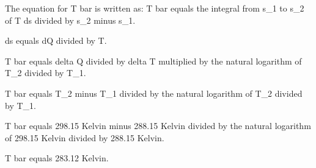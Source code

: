 The equation for T bar is written as:  
T bar equals the integral from s_1 to s_2 of T ds divided by s_2 minus s_1.  

ds equals dQ divided by T.  

T bar equals delta Q divided by delta T multiplied by the natural logarithm of T_2 divided by T_1.  

T bar equals T_2 minus T_1 divided by the natural logarithm of T_2 divided by T_1.  

T bar equals 298.15 Kelvin minus 288.15 Kelvin divided by the natural logarithm of 298.15 Kelvin divided by 288.15 Kelvin.  

T bar equals 283.12 Kelvin.